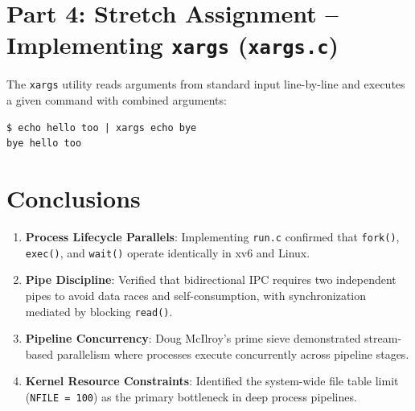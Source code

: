 \documentclass[12pt,a4paper]{article}
\begin{document}
\section{Part 4: Stretch Assignment -- Implementing \texttt{xargs} (\texttt{xargs.c})}

The \texttt{xargs} utility reads arguments from standard input line-by-line and executes a given command with combined arguments:
\begin{lstlisting}[style=consolestyle]
$ echo hello too | xargs echo bye
bye hello too
\end{lstlisting}

\section{Conclusions}

\begin{enumerate}
    \item \textbf{Process Lifecycle Parallels}: Implementing \texttt{run.c} confirmed that \texttt{fork()}, \texttt{exec()}, and \texttt{wait()} operate identically in xv6 and Linux.
    \item \textbf{Pipe Discipline}: Verified that bidirectional IPC requires two independent pipes to avoid data races and self-consumption, with synchronization mediated by blocking \texttt{read()}.
    \item \textbf{Pipeline Concurrency}: Doug McIlroy's prime sieve demonstrated stream-based parallelism where processes execute concurrently across pipeline stages.
    \item \textbf{Kernel Resource Constraints}: Identified the system-wide file table limit (\texttt{NFILE = 100}) as the primary bottleneck in deep process pipelines.
\end{enumerate}
\end{document}
